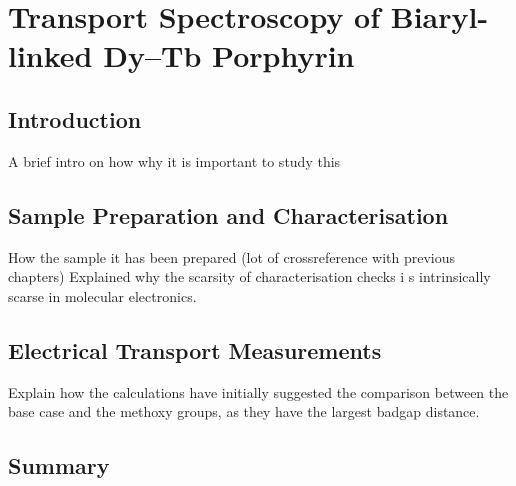 \chapter{\label{ch:porphyrin}Transport Spectroscopy of Biaryl-linked Dy--Tb Porphyrin}

\minitoc

\section{Introduction}\label{prp:sec:intro}

A brief intro on how why it is important to study this


\section{Sample Preparation and Characterisation}\label{prp:sec:chara}

How the sample it has been prepared (lot of crossreference with previous chapters)
Explained why the scarsity of characterisation checks i
s intrinsically scarse in molecular electronics.


\section{Electrical Transport Measurements}\label{prp:sec:measure}

Explain how the calculations have initially suggested the comparison between the base case and the methoxy groups,
as they have the largest badgap distance.

\section{Summary}\label{prp:sec:summary}